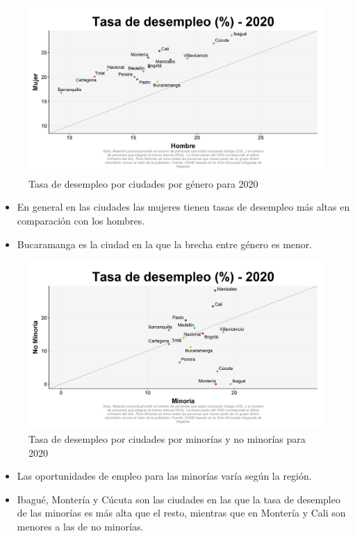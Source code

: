     \begin{figure}[H]
        \caption{Tasa de desempleo por ciudades por género para 2020 \label{map_result_2} }
        \begin{center}
        \includegraphics[width=\textwidth,keepaspectratio]{img/var_44_scatter.png}
        \end{center}
    \end{figure}
            \begin{itemize}
                \item En general en las ciudades las mujeres tienen tasas de desempleo más altas en comparación con los hombres.
                \item Bucaramanga es la ciudad en la que la brecha entre género es menor.
                \end{itemize}

    \begin{figure}[H]
        \caption{Tasa de desempleo por ciudades por minorías y no minorías para 2020 \label{map_result_2} }
        \begin{center}
        \includegraphics[width=\textwidth,keepaspectratio]{img/var_43_scatter.png}
        \end{center}
    \end{figure}
            \begin{itemize}
                \item Las oportunidades de empleo para las minorías varía según la región.
                \item Ibagué, Montería y Cúcuta son las ciudades en las que la tasa de desempleo de las minorías es más alta que el resto, mientras que en Montería y Cali son menores a las de no minorías.
                \end{itemize}

